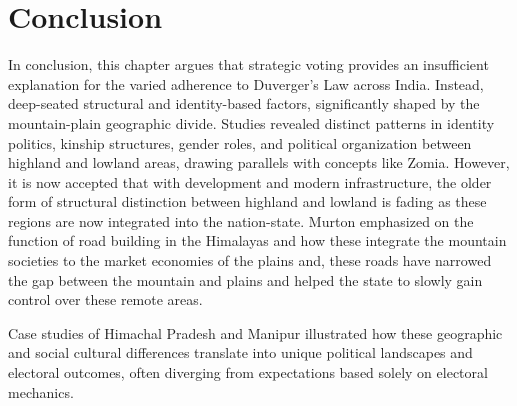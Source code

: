 \section{Conclusion}
\begin{sloppypar}
    
In conclusion, this chapter argues that strategic voting provides an insufficient explanation for the varied adherence to Duverger's Law across India. Instead, deep\hyp{}seated structural and identity\hyp{}based factors, significantly shaped by the mountain\hyp{}plain geographic divide. Studies revealed distinct patterns in identity politics, kinship structures, gender roles, and political organization between highland and lowland areas, drawing parallels with concepts like Zomia. However, it is now accepted that with development and modern infrastructure, the older form of structural distinction between highland and lowland is fading as these regions are now integrated into the nation\hyp{}state. Murton emphasized on the function of road building in the Himalayas and how these integrate the mountain societies to the market economies of the plains \citep{murton2013himalayan} and, these roads have narrowed the gap between the mountain and plains and helped the  state to slowly gain control over these remote areas.
\end{sloppypar}
Case studies of Himachal Pradesh and Manipur illustrated how these geographic and social cultural differences translate into unique political landscapes and electoral outcomes, often diverging from expectations based solely on electoral mechanics. 


